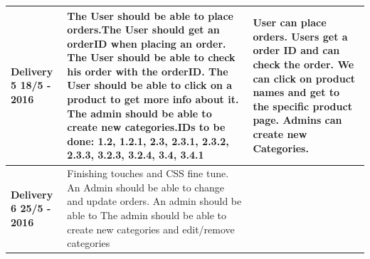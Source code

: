 \documentclass[a4paper,12pt]{article}
\begin{document}
\begin{table}[htbp]
\begin{tabular}{|L{4cm}|L{7cm}|L{4cm}|}
		\textbf{Delivery 5 18/5 - 2016} & The User should be able to place orders.\newline The User should get an orderID when placing an order. \newline The User should be able to check his order with the orderID. \newline The User should be able to click on a product to get more info about it. \newline The admin should be able to create new categories.\newline IDs to be done: 1.2, 1.2.1, 2.3, 2.3.1, 2.3.2, 2.3.3, 3.2.3, 3.2.4, 3.4, 3.4.1 & User can place orders. \newline Users get a order ID and can check the order. \newline We can click on product names and get to the specific product page. \newline Admins can create new Categories.            \\ \hline
		\textbf{Delivery 6 25/5 - 2016} & Finishing touches and CSS fine tune. \newline An Admin should be able to change and update orders. \newline An admin should be able to  \newline The admin should be able to create new categories and edit/remove categories &                 \\ \hline
	\end{tabular}
\end{table}
\end{document}
